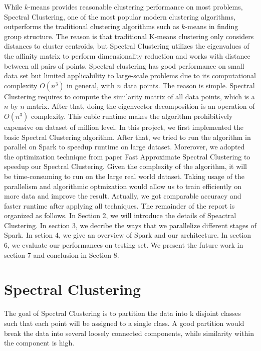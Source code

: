 \documentclass{acm_proc_article-sp}
\begin{document}
While $k$-means provides reasonable clustering performance on most problems, 
Spectral Clustering, one of the most popular modern clustering algorithms, outperforms the traditional clustering algorithms such as $k$-means in finding group structure. The reason is that traditional K-means clustering only considers distances to cluster centroids, but Spectral Clustering utilizes the eigenvalues of the affinity matrix to perform dimensionality reduction and works with distance between all pairs of points. Spectral clustering has good performance on small data set but limited applicability to large-scale problems due to its computational complexity $O(n^3)$ in general, with $n$ data points. The reason is simple. Spectral Clustering requires to compute the similarity matrix of all data points, which is a $n$ by $n$ matrix. After that, doing the eigenvector decomposition is an operation of 
$O(n^3)$ complexity. This cubic runtime makes the algorithm prohibitively expensive on dataset of million level. In this project, we first implemented the basic Spectral Clustering algorithm. After that, we tried to run the algorithm in parallel on Spark to speedup runtime on large dataset. Morerover, we adopted the optimization technique from paper Fast Approximate Spectral Clustering \cite{yan2009fast} to speedup our Spectral Clustering. Given the complexity of the algorithm, it will be time-consuming to run on the large real world dataset. Taking usage of the parallelism and algorithmic optmization would allow us to train efficiently on more data and improve the result. Actually, we got comparable accuracy and faster runtime after applying all techniques. The remainder of the report is organized as follows. In Section 2, we will introduce the details of Speactral Clustering. In section 3, we decribe the ways that we parallelize different stages of Spark. In setion 4, we give an overview of Spark and our architecture. In section 6,  we evaluate our performances on testing set. We present the future work in section 7 and conclusion in Section 8.

\section{Spectral Clustering}
The goal of Spectral Clustering is to partition the data into k disjoint classes such that each point will be assigned to a single class. A good partition would break the data into several loosely connected components, while similarity within the component is high.
\end{document}
